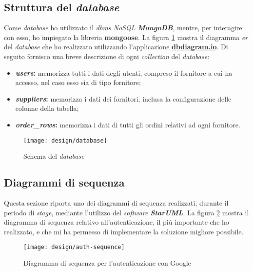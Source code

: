 \subsection{Struttura del \emph{database}}
Come \emph{database} ho utilizzato il \emph{\acrshort{dbms} NoSQL \textbf{MongoDB}}, mentre, per interagire con esso, ho impiegato la libreria \textbf{mongoose}. 
La figura \ref{fig:db-design} mostra il diagramma \emph{\acrshort{er}} del \emph{database} che ho realizzato utilizzando l'applicazione \textbf{\href{https://dbdiagram.io/}{dbdiagram.io}}. 
Di seguito fornisco una breve descrizione di ogni \emph{collection} del \emph{database}:

\begin{itemize}
  \item \textbf{\emph{users}:} memorizza tutti i dati degli utenti, compreso il fornitore a cui ha accesso, nel caso esso sia di tipo fornitore;
  \item \textbf{\emph{suppliers}:} memorizza i dati dei fornitori, inclusa la configurazione delle colonne della tabella;
  \item \textbf{\emph{order\_rows}:} memorizza i dati di tutti gli ordini relativi ad ogni fornitore.
\end{itemize}

\begin{figure}[!ht]
  \begin{center}
    \texttt{[image: design/database]}
    \caption{Schema del \emph{database}}
    \label{fig:db-design}
  \end{center}
\end{figure}

\subsection{Diagrammi di sequenza}
Questa sezione riporta uno dei diagrammi di sequenza realizzati, durante il periodo di \emph{stage}, mediante l'utilizzo del \emph{software \textbf{StarUML}}.
La figura \ref{fig:auth-sequence} mostra il diagramma di sequenza relativo all'autenticazione, il più importante che ho realizzato, e che mi ha permesso di implementare la soluzione migliore possibile.

\begin{figure}[!ht]
  \begin{center}
    \texttt{[image: design/auth-sequence]}
    \caption{Diagramma di sequenza per l'autenticazione con Google}
    \label{fig:auth-sequence}
  \end{center}
\end{figure}

